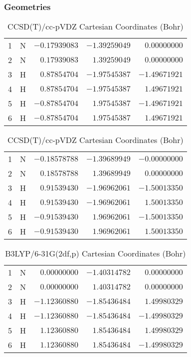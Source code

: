 \documentclass[10pt,oneside]{article}
\begin{document}
\begin{table}[h!]
\subsubsection*{Geometries}
\begin{multicols}{2}
\centering
\caption{CCSD(T)/cc-pVTZ Cartesian Coordinates (Bohr)}
\begin{tabular}{llrrr}
\toprule
1  & N  & $-0.17939083$ & $-1.39259049$ & $ 0.00000000$ \\
2  & N  & $ 0.17939083$ & $ 1.39259049$ & $ 0.00000000$ \\
3  & H  & $ 0.87854704$ & $-1.97545387$ & $-1.49671921$ \\
4  & H  & $ 0.87854704$ & $-1.97545387$ & $ 1.49671921$ \\
5  & H  & $-0.87854704$ & $ 1.97545387$ & $-1.49671921$ \\
6  & H  & $-0.87854704$ & $ 1.97545387$ & $ 1.49671921$ \\
\bottomrule
\end{tabular}
\caption{CCSD(T)/cc-pVDZ Cartesian Coordinates (Bohr)}
\begin{tabular}{llrrr}
\toprule
1  & N  & $-0.18578788$ & $-1.39689949$ & $-0.00000000$ \\
2  & N  & $ 0.18578788$ & $ 1.39689949$ & $ 0.00000000$ \\
3  & H  & $ 0.91539430$ & $-1.96962061$ & $-1.50013350$ \\
4  & H  & $ 0.91539430$ & $-1.96962061$ & $ 1.50013350$ \\
5  & H  & $-0.91539430$ & $ 1.96962061$ & $-1.50013350$ \\
6  & H  & $-0.91539430$ & $ 1.96962061$ & $ 1.50013350$ \\
\bottomrule
\end{tabular}
\end{multicols}
\end{table}

\begin{table}[h]
\centering
\caption{B3LYP/6-31G(2df,p) Cartesian Coordinates (Bohr)}
\begin{tabular}{llrrr}
\toprule
1  & N  & $ 0.00000000$ & $-1.40314782$ & $ 0.00000000$ \\
2  & N  & $ 0.00000000$ & $ 1.40314782$ & $ 0.00000000$ \\
3  & H  & $-1.12360880$ & $-1.85436484$ & $ 1.49980329$ \\
4  & H  & $-1.12360880$ & $-1.85436484$ & $-1.49980329$ \\
5  & H  & $ 1.12360880$ & $ 1.85436484$ & $ 1.49980329$ \\
6  & H  & $ 1.12360880$ & $ 1.85436484$ & $-1.49980329$ \\
\bottomrule
\end{tabular}
\end{table}
\end{document}
